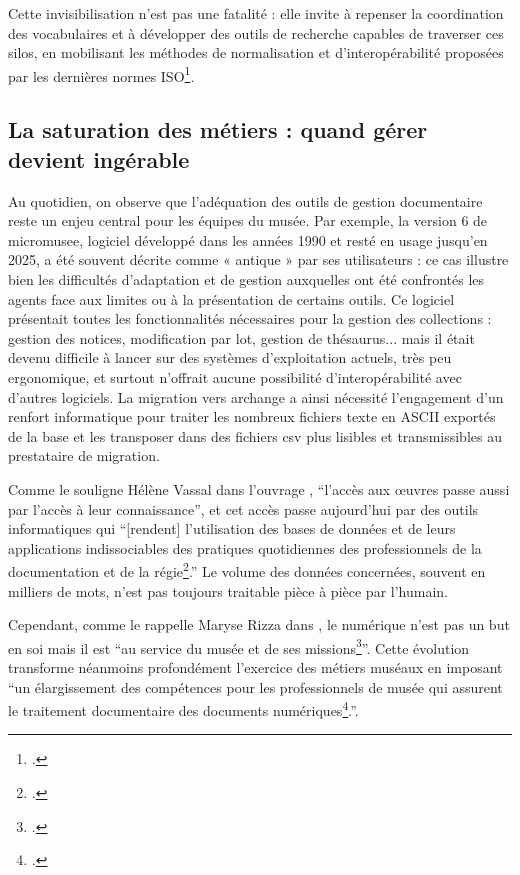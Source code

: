 Cette invisibilisation n’est pas une fatalité : elle invite à repenser la coordination des vocabulaires et à développer des outils de recherche capables de traverser ces silos, en mobilisant les méthodes de normalisation et d’interopérabilité proposées par les dernières normes ISO\footcite{chichereauNormesConceptionGestion2007}.

\subsection{La saturation des métiers : quand gérer devient ingérable}

Au quotidien, on observe que l’adéquation des outils de gestion documentaire reste un enjeu central pour les équipes du musée. Par exemple, la version 6 de \gls{micromusee}, logiciel développé dans les années 1990 et resté en usage jusqu’en 2025, a été souvent décrite comme « antique » par ses utilisateurs : ce cas illustre bien les difficultés d’adaptation et de gestion auxquelles ont été confrontés les agents face aux limites ou à la présentation de certains outils. Ce logiciel présentait toutes les fonctionnalités nécessaires pour la gestion des collections : gestion des notices, modification par lot, gestion de thésaurus... mais il était devenu difficile à lancer sur des systèmes d’exploitation actuels, très peu ergonomique, et surtout n’offrait aucune possibilité d’interopérabilité avec d’autres logiciels. La migration vers \gls{archange} a ainsi nécessité l’engagement d’un renfort informatique pour traiter les nombreux fichiers texte en ASCII exportés de la base et les transposer dans des fichiers csv plus lisibles et transmissibles au prestataire de migration.

Comme le souligne Hélène Vassal dans l'ouvrage , \enquote{l’accès aux œuvres passe aussi par l’accès à leur connaissance}, et cet accès passe aujourd’hui par des outils informatiques qui \enquote{[rendent] l’utilisation des bases de données et de leurs applications indissociables des pratiques quotidiennes des professionnels de la documentation et de la régie\footcite{merleau-pontyDocumenterCollectionsMusees2016}.} Le volume des données concernées, souvent en milliers de mots, n’est pas toujours traitable pièce à pièce par l’humain.

Cependant, comme le rappelle Maryse Rizza dans , le numérique n’est pas un but en soi mais il est \enquote{au service du musée et de ses missions\footcite{ricardRGPDArchives2018a}}. Cette évolution transforme néanmoins profondément l’exercice des métiers muséaux en imposant \enquote{un élargissement des compétences pour les professionnels de musée qui assurent le traitement documentaire des documents numériques\footcite{rizzaDocumentAuCoeur2014}.}.

